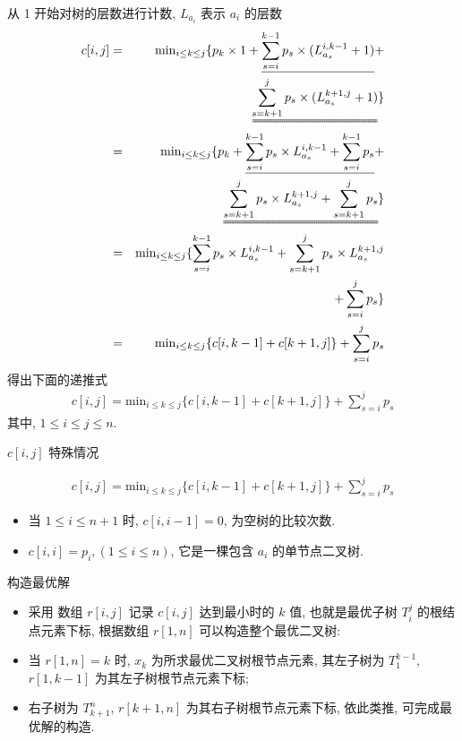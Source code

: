 \documentclass[fontset=fandol,UTF8,fleqn]{beamer}
\begin{document}
\begin{frame}{}
从 1 开始对树的层数进行计数, $L_{a_i}$ 表示 $a_i$ 的层数 
\begin{eqnarray*}
  c[i,j] & = & \mathrm{min}_{i\leq k\leq j}\{p_k\times 1+\underline{\sum_{s=i}^{k-1}p_s\times (L^{i,k-1}_{a_s}+1)}+\\
& & \uuline{\sum_{s=k+1}^jp_s\times(L^{k+1,j}_{a_s}+1)}\}   \\
& = & \mathrm{min}_{i\leq k\leq j}\{p_k+\underline{\sum_{s=i}^{k-1}p_s\times L^{i,k-1}_{a_s}+\sum_{s=i}^{k-1}p_s}+\\
& & \uuline{\sum_{s=k+1}^jp_s\times L^{k+1,j}_{a_s}+\sum_{s=k+1}^jp_s}\}   \\
& = & \mathrm{min}_{i\leq k\leq j}\{\sum_{s=i}^{k-1}p_s\times L^{i,k-1}_{a_s}+
 \sum_{s=k+1}^jp_s\times L^{k+1,j}_{a_s}   \\
& & + \sum_{s=i}^jp_s \}   \\
& = & \mathrm{min}_{i\leq k\leq j}\{c[i,k-1]+c[k+1,j]\}+\sum_{s=i}^jp_s  
\end{eqnarray*}
得出下面的递推式 
\begin{eqnarray*}
  c[i,j] =  \mathrm{min}_{i\leq k\leq j}\{c[i,k-1]+c[k+1,j]\}+\sum_{s=i}^jp_s 
\end{eqnarray*}
其中, $1\leq i\leq j\leq n$. 
\end{frame}

\begin{frame}{$c[i,j]$ 特殊情况}

\begin{eqnarray*}
  c[i,j] =  \mathrm{min}_{i\leq k\leq j}\{c[i,k-1]+c[k+1,j]\}+\sum_{s=i}^jp_s
\end{eqnarray*}

\begin{itemize}
\item  当 $1\leq i\leq n+1$ 时, $c[i,i-1]=0$, 为空树的比较次数.  
\item $ c[i,i]=p_i, (1\leq i\leq n)$, 它是一棵包含 $a_i$ 的单节点二叉树.  
\end{itemize}
\end{frame}

\begin{frame}{构造最优解}
\begin{itemize}
\item 采用 数组 $r[i,j]$ 记录 $c[i,j]$ 达到最小时的 $k$ 值, 也就是最优子树 $T_i^j$ 的根结点元素下标, 根据数组 $r[1,n]$ 可以构造整个最优二叉树:   
\item 当 $r[1,n]=k$ 时, $x_k$ 为所求最优二叉树根节点元素, 其左子树为 $T_1^{k-1}$, $r[1, k-1]$ 为其左子树根节点元素下标; 
\item 右子树为 $T_{k+1}^n$, $r[k+1, n]$ 为其右子树根节点元素下标, 依此类推, 可完成最优解的构造. 
\end{itemize}
\end{frame}
\end{document}
